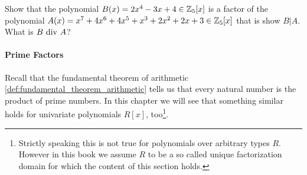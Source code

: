 \begin{exercise}
Show that the polynomial $B(x)= 2x^4-3x+4\in \mathbb{Z}_5[x]$ is a factor of the polynomial $A(x)=x^7 + 4x^6 + 4x^5 + x^3 + 2x^2 + 2x + 3\in\mathbb{Z}_5[x]$ that is show $B|A$. What is $B \text{ div } A$?
\end{exercise}
\paragraph{Prime Factors} Recall that the fundamental theorem of arithmetic \ref{def:fundamental_theorem_arithmetic} tells us that every natural number is the product of prime numbers. In this chapter we will see that something similar holds for univariate polynomials $R[x]$, too\footnote{Strictly speaking this is not true for polynomials over arbitrary types $R$. However in this book we assume $R$ to be a so called unique factorization domain for which the content of this section holds.}.

